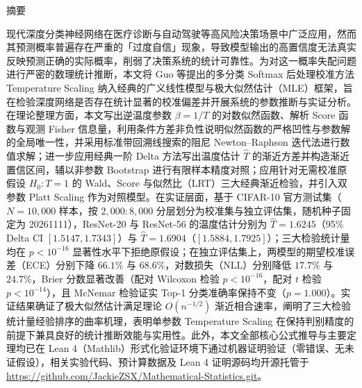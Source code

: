 {}
\begin{center}
  {\heiti{} 摘\quad 要}
\end{center}
\vspace{0.5em}

现代深度分类神经网络在医疗诊断与自动驾驶等高风险决策场景中广泛应用，然而其预测概率普遍存在严重的「过度自信」现象，导致模型输出的高置信度无法真实反映预测正确的实际概率，削弱了决策系统的统计可靠性。为对这一概率失配问题进行严密的数理统计推断，本文将 Guo 等提出的多分类 Softmax 后处理校准方法 Temperature Scaling 纳入经典的广义线性模型与极大似然估计（MLE）框架，旨在检验深度网络是否存在统计显著的校准偏差并开展系统的参数推断与实证分析。在理论整理方面，本文写出逆温度参数 $\beta = 1/T$ 的对数似然函数、解析 Score 函数与观测 Fisher 信息量，利用条件方差非负性说明似然函数的严格凹性与参数解的全局唯一性，并采用标准带回溯线搜索的阻尼 Newton--Raphson 迭代法进行数值求解；进一步应用经典一阶 Delta 方法写出温度估计 $\hat T$ 的渐近方差并构造渐近置信区间，辅以非参数 Bootstrap 进行有限样本精度对照；应用针对无需校准原假设 $H_0: T=1$ 的 Wald、Score 与似然比（LRT）三大经典渐近检验，并引入双参数 Platt Scaling 作为对照模型。在实证层面，基于 CIFAR-10 官方测试集（$N=10{,}000$ 样本，按 $2{,}000:8{,}000$ 分层划分为校准集与独立评估集，随机种子固定为 20261111），ResNet-20 与 ResNet-56 的温度估计分别为 $\hat T = 1.6245$（95\% Delta CI $[1.5147, 1.7343]$）与 $\hat T = 1.6904$（$[1.5884, 1.7925]$）；三大检验统计量均在 $p < 10^{-16}$ 显著性水平下拒绝原假设；在独立评估集上，两模型的期望校准误差（ECE）分别下降 $66.1\%$ 与 $68.6\%$，对数损失（NLL）分别降低 $17.7\%$ 与 $24.7\%$，Brier 分数显著改善（配对 Wilcoxon 检验 $p < 10^{-16}$，配对 $t$ 检验 $p < 10^{-14}$），且 McNemar 检验证实 Top-1 分类准确率保持不变（$p = 1.000$）。实证结果确证了极大似然估计满足理论 $O(n^{-1/2})$ 渐近相合速率，阐明了三大检验统计量经验排序的曲率机理，表明单参数 Temperature Scaling 在保持判别精度的前提下兼具良好的统计推断效能与实用性。此外，本文全部核心公式推导与主要定理均已在 Lean 4（Mathlib）形式化验证环境下通过机器证明验证（零错误、无未证假设），相关实验代码、预计算数据及 Lean 4 证明源码均开源托管于 \url{https://github.com/JackieZSX/Mathematical-Statistics.git}。

